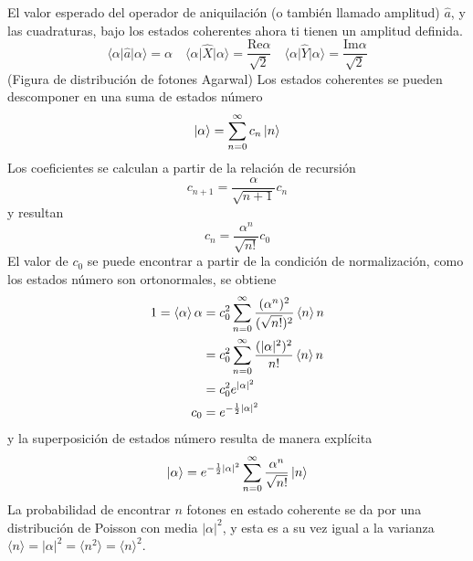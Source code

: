 El valor esperado del operador de aniquilación (o también llamado amplitud) $\hat{a}$, y las cuadraturas, bajo los estados coherentes ahora ti tienen un amplitud definida.
\begin{equation*}
\langle \alpha \vert \hat{a} \vert\alpha \rangle = \alpha \quad \langle \alpha \vert \hat{X} \vert \alpha \rangle = \frac{\mathrm{Re}\alpha}{\sqrt{2}} \quad \langle \alpha \vert \hat{Y} \vert \alpha\rangle = \frac{\mathrm{Im}\alpha}{\sqrt{2}}
\end{equation*}
(Figura de distribución de fotones Agarwal)
Los estados coherentes se pueden descomponer en una suma de estados número
\begin{equation*}
  \ket{\alpha} = \sum_{n=0}^{\infty} c_n \ket{n}
\end{equation*}
Los coeficientes se calculan a partir de la relación de recursión
\begin{equation*}
  c_{n+1} = \frac{\alpha}{\sqrt{n+1}}c_n
\end{equation*}
y resultan
\begin{equation*}
  c_n = \frac{\alpha^n }{\sqrt{n!}}c_0
\end{equation*}
El valor de $c_0$ se puede encontrar a partir de la condición de normalización, como los estados número son ortonormales, se obtiene
\begin{align*}
  1 = \braket{\alpha}{\alpha} & = c_0^2 \sum_{n=0}^{\infty} \frac{(\alpha^n)^2}{(\sqrt{n!})^2}\braket{n}{n} \\ &= c_0^2  \sum_{n=0}^{\infty} \frac{(|\alpha|^2)^2}{n!}\braket{n}{n}\\ &= c_0^2 e^{|\alpha|^2} \\
  c_0                         & = e^{-\frac{1}{2}|\alpha|^2}
\end{align*}
y la superposición de estados número resulta de manera explícita
\begin{equation*}
  \ket{\alpha} = e^{-\frac{1}{2}|\alpha|^2} \sum_{n=0}^{\infty} \frac{\alpha^n}{\sqrt{n!}}\ket{n}
\end{equation*}
La probabilidad de encontrar $n$ fotones en estado coherente se da por una distribución de Poisson con media $|\alpha|^2$, y esta es a su vez igual a la varianza $\langle n \rangle = |\alpha|^2 = \langle n^2 \rangle = \langle n \rangle^2$.

